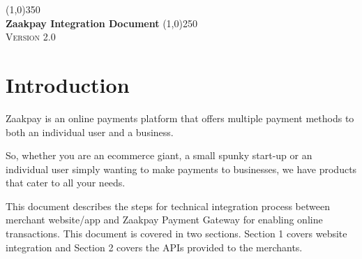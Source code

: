 \documentclass{article}
\begin{document}
\begin{titlepage}
\begin{center}
\begin{figure}[H]
\centering
\end{figure}
\line(1,0){350}\\
\huge{\bfseries Zaakpay Integration Document}
\line(1,0){250}\\
[1.5cm]
\textsc{\Large Version 2.0}
\end{center}


\end{titlepage}
\thispagestyle{empty}
\tableofcontents
\thispagestyle{empty}
\newpage
\listoffigures
\listoftables
\thispagestyle{empty}
\cleardoublepage
\setcounter{page}{1}
\section{Introduction}\label{sec:Intro}
Zaakpay is an online payments platform that offers multiple payment methods to both an individual user and a business. 

So, whether you are an ecommerce giant, a small spunky start-up or an individual user simply wanting to make payments to businesses, we have products that cater to all your needs.

This document describes the steps for technical integration process between merchant website/app and Zaakpay Payment Gateway for enabling online transactions. This document is covered in two sections. Section 1 covers website integration and Section 2 covers the APIs provided to the merchants.
\end{document}
